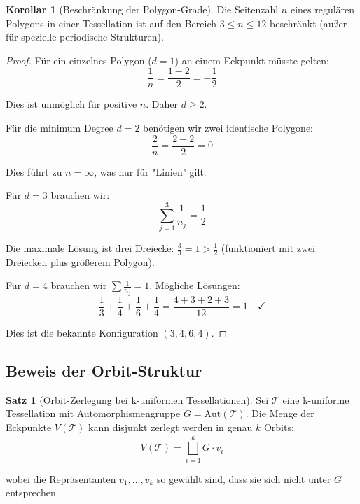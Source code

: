 \documentclass[a4paper,12pt]{article}
\theoremstyle{definition}
\newtheorem{satz}{Satz}[section]
\newtheorem{korollar}{Korollar}[section]
\begin{document}
\begin{korollar}[Beschränkung der Polygon-Grade]
	Die Seitenzahl $n$ eines regulären Polygons in einer Tessellation ist auf den Bereich $3 \leq n \leq 12$ beschränkt (außer für spezielle periodische Strukturen).
\end{korollar}

\begin{proof}
	Für ein einzelnes Polygon ($d=1$) an einem Eckpunkt müsste gelten:
	\[
	\frac{1}{n} = \frac{1-2}{2} = -\frac{1}{2}
	\]
	
	Dies ist unmöglich für positive $n$. Daher $d \geq 2$.
	
	Für die minimum Degree $d=2$ benötigen wir zwei identische Polygone:
	\[
	\frac{2}{n} = \frac{2-2}{2} = 0
	\]
	
	Dies führt zu $n = \infty$, was nur für "Linien" gilt.
	
	Für $d=3$ brauchen wir:
	\[
	\sum_{j=1}^{3} \frac{1}{n_j} = \frac{1}{2}
	\]
	
	Die maximale Lösung ist drei Dreiecke: $\frac{3}{3} = 1 > \frac{1}{2}$ (funktioniert mit zwei Dreiecken plus größerem Polygon).
	
	Für $d=4$ brauchen wir $\sum \frac{1}{n_j} = 1$. Mögliche Lösungen:
	\[
	\frac{1}{3} + \frac{1}{4} + \frac{1}{6} + \frac{1}{4} = \frac{4 + 3 + 2 + 3}{12} = 1 \quad \checkmark
	\]
	
	Dies ist die bekannte Konfiguration $(3,4,6,4)$.
\end{proof}

\subsection{Beweis der Orbit-Struktur}

\begin{satz}[Orbit-Zerlegung bei k-uniformen Tessellationen]
	Sei $\mathcal{T}$ eine k-uniforme Tessellation mit Automorphismengruppe $G = \text{Aut}(\mathcal{T})$. Die Menge der Eckpunkte $V(\mathcal{T})$ kann disjunkt zerlegt werden in genau $k$ Orbits:
	\[
	V(\mathcal{T}) = \bigsqcup_{i=1}^{k} G \cdot v_i
	\]
	
	wobei die Repräsentanten $v_1, \ldots, v_k$ so gewählt sind, dass sie sich nicht unter $G$ entsprechen.
\end{satz}
\end{document}
